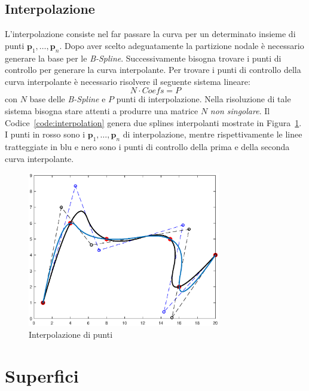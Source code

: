 \documentclass[a4paper, 12pt]{article}
\begin{document}
\subsection{Interpolazione}

L'interpolazione consiste nel far passare la curva per un determinato insieme di punti $\mathbf{p}_1, \dots, \mathbf{p}_n$.
Dopo aver scelto adeguatamente la partizione nodale è necessario generare la base per le \textit{B-Spline}. Successivamente 
bisogna trovare i punti di controllo per generare la curva interpolante. 
Per trovare i punti di controllo della curva interpolante è necessario risolvere il seguente sistema lineare:
$$N \cdot Coefs = P$$
con $N$ base delle \textit{B-Spline} e $P$ punti di interpolazione. Nella risoluzione di tale sistema bisogna stare 
attenti a produrre una matrice $N$ \textit{non singolare}.
Il Codice~\ref{code:interpolation} genera due splines interpolanti mostrate in Figura~\ref{fig:interpolation}. I punti in rosso sono i   
$\mathbf{p}_1, \dots, \mathbf{p}_n$ di interpolazione, mentre 
rispettivamente le linee tratteggiate in blu e nero sono i punti di controllo della prima e della seconda curva interpolante.




\begin{figure}[]
  \centering
  \includegraphics[width=0.75\textwidth]{figure/interpolation.eps}
  \caption{Interpolazione di punti}
  \label{fig:interpolation}
\end{figure} 


\section{Superfici}
\end{document}
